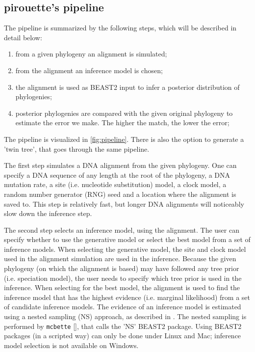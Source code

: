 \documentclass{article}
\begin{document}
\subsection{pirouette's pipeline}
The pipeline is summarized by the following steps,
which will be described in detail below:
\begin{enumerate}
    \item from a given phylogeny an alignment is simulated;
    \item from the alignment an inference model is chosen;
    \item the alignment is used as BEAST2 input to infer a posterior distribution of phylogenies;
    \item posterior phylogenies are compared with the given original phylogeny to estimate the error we make. The higher the match, the lower the error;
\end{enumerate}
The pipeline is visualized in \ref{fig:pipeline}.
There is also the option to generate a 'twin tree',
that goes through the same pipeline.

The first step simulates a DNA alignment from the given phylogeny.
One can specify a DNA sequence
of any length at the root of the phylogeny, a DNA mutation rate, a
site (i.e. nucleotide substitution) model, 
a clock model, a random number generator (RNG) seed and a location
where the alignment is saved to. This step is relatively fast, but longer
DNA alignments will noticeably slow down the inference step.

The second step selects an inference model, using the alignment.
The user can specify whether to use the generative model or select the best model
from a set of inference models. 
When selecting the generative model,
the site and clock model used in the alignment simulation are used
in the inference. Because the given phylogeny (on which the alignment is based)
may have followed any tree prior (i.e. speciation model), the user needs
to specify which tree prior is used in the inference. 
When selecting for the best
model, the alignment is used to find the inference model that has the
highest evidence (i.e. marginal likelihood) from a set of candidate inference models.
The evidence of an inference model is estimated using a nested sampling (NS)
approach, as described in \cite{maturana2018model}. The nested sampling is
performed by \verb;mcbette; [\cite{mcbette}], that calls the 'NS' BEAST2 package. 
Using BEAST2 packages (in a scripted way) can only be done under Linux and Mac; 
inference model selection is not available on Windows.
\end{document}
